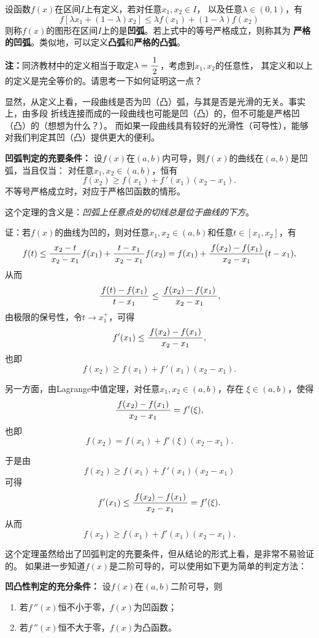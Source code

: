 \begin{thx}
	设函数$f(x)$在区间$I$上有定义，若对任意$x_1,x_2\in I$，
	以及任意$\lambda\in(0,1)$，有
	$$f[\lambda x_1+(1-\lambda)x_2]\leq\lambda f(x_1)+(1-\lambda)f(x_2)$$
	则称$f(x)$的图形在区间$I$上的是{\bf 凹弧}。若上式中的等号严格成立，则称其为
	{\bf 严格的凹弧}。类似地，可以定义{\bf 凸弧}和{\bf 严格的凸弧}。
\end{thx}
{\bf 注：}同济教材中的定义相当于取定$\lambda=\displaystyle\frac{\,{1}\,}{\,{2}\,}$，考虑到$x_1,x_2$的任意性，
其定义和以上的定义是完全等价的。请思考一下如何证明这一点？

显然，从定义上看，一段曲线是否为凹（凸）弧，与其是否是光滑的无关。事实上，由多段
折线连接而成的一段曲线也可能是凹（凸）的，但不可能是严格凹（凸）的（想想为什么？）。
而如果一段曲线具有较好的光滑性（可导性），能够对我们判定其凹（凸）提供更大的便利。

\begin{thx}
	{\bf 凹弧判定的充要条件：}
	设$f(x)$在$(a,b)$内可导，则$f(x)$的曲线在$(a,b)$是凹弧，当且仅当：
	对任意$x_1,x_2\in(a,b)$，恒有
	$$f(x_2)\geq f(x_1)+f\,'(x_1)(x_2-x_1). $$
	不等号严格成立时，对应于严格凹函数的情形。
\end{thx}
这个定理的含义是：{\it 凹弧上任意点处的切线总是位于曲线的下方}。

证：若$f(x)$的曲线为凹的，则对任意$x_1,x_2\in(a,b)$和任意$t\in[x_1,x_2]$，有
$$f(t)\leq\displaystyle\frac{\,{x_2-t}\,}{\,{x_2-x_1}\,}f(x_1)+\displaystyle\frac{\,{t-x_1}\,}{\,{x_2-x_1}\,}f(x_2)
=f(x_1)+\displaystyle\frac{\,{f(x_2)-f(x_1)}\,}{\,{x_2-x_1}\,}(t-x_1),$$
从而
$$\displaystyle\frac{\,{f(t)-f(x_1)}\,}{\,{t-x_1}\,}\leq\displaystyle\frac{\,{f(x_2)-f(x_1)}\,}{\,{x_2-x_1}\,},$$
由极限的保号性，令$t\to x_1^+$，可得
$$f'(x_1)\leq\displaystyle\frac{\,{f(x_2)-f(x_1)}\,}{\,{x_2-x_1}\,},$$
也即
$$f(x_2)\geq f(x_1)+f\,'(x_1)(x_2-x_1).$$

另一方面，由Lagrange中值定理，对任意$x_1,x_2\in(a,b)$，存在
$\xi\in(a,b)$，使得
$$\displaystyle\frac{\,{f(x_2)-f(x_1)}\,}{\,{x_2-x_1}\,}=f'(\xi),$$
也即
$$f(x_2)=f(x_1)+f'(\xi)(x_2-x_1).$$

于是由
$$f(x_2)\geq f(x_1)+f\,'(x_1)(x_2-x_1)$$
可得
$$f'(x_1)\leq\displaystyle\frac{\,{f(x_2)-f(x_1)}\,}{\,{x_2-x_1}\,}=f'(\xi).$$
从而
$$f(x_2)\geq f(x_1)+f'(x_1)(x_2-x_1).$$
\fin

这个定理虽然给出了凹弧判定的充要条件，但从结论的形式上看，是非常不易验证的。
如果进一步知道$f(x)$是二阶可导的，可以使用如下更为简单的判定方法：

\begin{thx}
	{\bf 凹凸性判定的充分条件：}
	设$f(x)$在$(a,b)$二阶可导，则
	\begin{enumerate}[(1)]
	  \item 若$f\,''(x)$恒不小于零，$f(x)$为凹函数；
	  \item 若$f\,''(x)$恒不大于零，$f(x)$为凸函数。
	\end{enumerate}
\end{thx}

